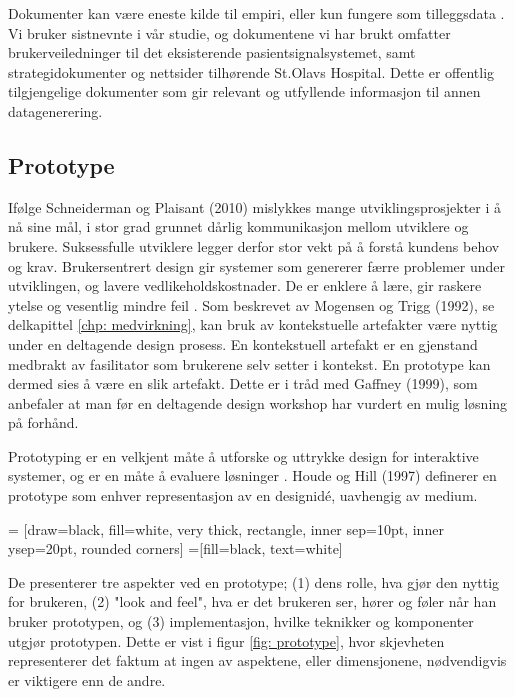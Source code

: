 \noindent
Dokumenter kan være eneste kilde til empiri, eller kun fungere som tilleggsdata \cite{Tjora}. Vi bruker sistnevnte i vår studie, og dokumentene vi har brukt omfatter brukerveiledninger til det eksisterende pasientsignalsystemet, samt strategidokumenter og nettsider tilhørende St.Olavs Hospital. Dette er offentlig tilgjengelige dokumenter som gir relevant og utfyllende informasjon til annen datagenerering.

\subsection{Prototype}
\label{subsec:prototype}
Ifølge Schneiderman og Plaisant (2010) mislykkes mange utviklingsprosjekter i å nå sine mål, i stor grad grunnet dårlig kommunikasjon mellom utviklere og brukere. Suksessfulle utviklere legger derfor stor vekt på å forstå kundens behov og krav. 
Brukersentrert design gir systemer som genererer færre problemer under utviklingen, og lavere vedlikeholdskostnader. De er enklere å lære, gir raskere ytelse og vesentlig mindre feil \cite{mmi}.
Som beskrevet av Mogensen og Trigg (1992), se delkapittel \ref{chp: medvirkning}, kan bruk av kontekstuelle artefakter være nyttig under en deltagende design prosess. En kontekstuell artefakt er en gjenstand medbrakt av fasilitator som brukerene selv setter i kontekst. En prototype kan dermed sies å være en slik artefakt. Dette er i tråd med Gaffney (1999), som anbefaler at man før en deltagende design workshop har vurdert en mulig løsning på forhånd.

\noindent
Prototyping er en velkjent måte å utforske og uttrykke design for interaktive systemer, og er en måte å evaluere løsninger \cite{Houde97}. Houde og Hill (1997) definerer en prototype som enhver representasjon av en designidé, uavhengig av medium. 

 = [draw=black, fill=white, very thick,
    rectangle, inner sep=10pt, inner ysep=20pt, rounded corners]
 =[fill=black, text=white]
%

\noindent
De presenterer tre aspekter ved en prototype; (1) dens rolle, hva gjør den nyttig for brukeren, (2) "look and feel", hva er det brukeren ser, hører og føler når han bruker prototypen, og (3) implementasjon, hvilke teknikker og komponenter utgjør prototypen. Dette er vist i figur \ref{fig: prototype}, hvor skjevheten representerer det faktum at ingen av aspektene, eller dimensjonene, nødvendigvis er viktigere enn de andre.

